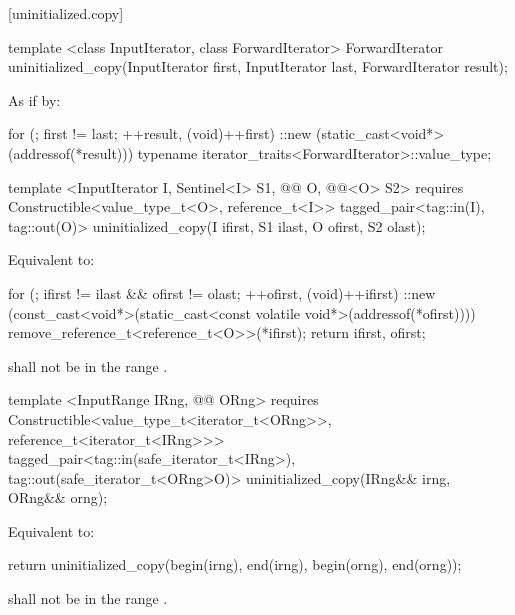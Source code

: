 [uninitialized.copy]{}
{\color{remclr}
\begin{codeblock}
template <class InputIterator, class ForwardIterator>
  ForwardIterator uninitialized_copy(InputIterator first, InputIterator last,
                                     ForwardIterator result);
\end{codeblock}

\setcounter{Paras}{0}
\pnum
\effects As if by:
\begin{codeblock}
    for (; first != last; ++result, (void)++first)
      ::new (static_cast<void*>(addressof(*result)))
        typename iterator_traits<ForwardIterator>::value_type;
\end{codeblock}

\setcounter{Paras}{1}
\pnum
\returns {}
} %

{\color{addclr}
\begin{codeblock}
template <InputIterator I, Sentinel<I> S1, @@ O, @@<O> S2>
  requires
Constructible<value_type_t<O>, reference_t<I>>
  tagged_pair<tag::in(I), tag::out(O)>
uninitialized_copy(I ifirst, S1 ilast, O ofirst, S2 olast);
\end{codeblock}

\setcounter{Paras}{0}
\pnum
\effects Equivalent to:
\begin{codeblock}
    for (; ifirst != ilast && ofirst != olast; ++ofirst, (void)++ifirst) {
      ::new (const_cast<void*>(static_cast<const volatile void*>(addressof(*ofirst))))
        remove_reference_t<reference_t<O>>(*ifirst);
    }
    return {ifirst, ofirst};
\end{codeblock}

\pnum
\requires {} shall not be in the range .

\begin{codeblock}
template <InputRange IRng, @@ ORng>
requires
  Constructible<value_type_t<iterator_t<ORng>>, reference_t<iterator_t<IRng>>>
tagged_pair<tag::in(safe_iterator_t<IRng>), tag::out(safe_iterator_t<ORng>O)>
  uninitialized_copy(IRng&& irng, ORng&& orng);
\end{codeblock}

\pnum
\effects Equivalent to:
\begin{codeblock}
    return uninitialized_copy(begin(irng), end(irng), begin(orng), end(orng));
\end{codeblock}

\pnum
\requires {} shall not be in the range .
} %

